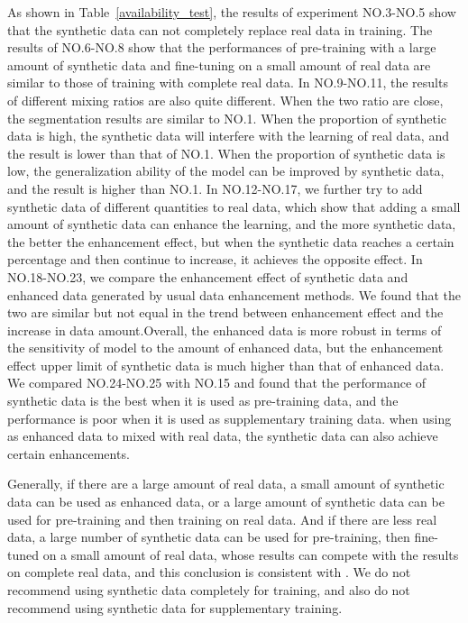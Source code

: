 \documentclass[letterpaper]{article} %
\begin{document}
As shown in Table~\ref{availability_test}, the results of experiment NO.3-NO.5 show that the synthetic data can not completely replace real data in training.           
The results of NO.6-NO.8 show that the performances of pre-training with a large amount of synthetic data and fine-tuning on a small amount of real data are similar to those of training with complete real data.  
In NO.9-NO.11, the results of different mixing ratios are also quite different. When the two ratio are close, the segmentation results are similar to NO.1. When the proportion of synthetic data is high, the synthetic data will interfere with the learning of real data, and the result is lower than that of NO.1. When the proportion of synthetic data is low, the generalization ability of the model can be improved by synthetic data, and the result is higher than NO.1.           
In NO.12-NO.17, we further try to add synthetic data of different quantities to real data, which show that adding a small amount of synthetic data can enhance the learning, and the more synthetic data, the better the enhancement effect, but when the synthetic data reaches a certain percentage and then continue to increase, it achieves the opposite effect. 
In NO.18-NO.23, we compare the enhancement effect of synthetic data and enhanced data generated by usual data enhancement methods. We found that the two are similar but not equal in the trend between  enhancement effect and the increase in data amount.Overall, the enhanced data is more robust in terms of the sensitivity of model to the amount of enhanced data, but the enhancement effect upper limit of synthetic data is much higher than that of enhanced data.  
We compared NO.24-NO.25 with NO.15 and found that the performance of synthetic data is the best when it is used as pre-training data, and the performance is poor when it is used as supplementary training data. when using as enhanced data to mixed with real data, the synthetic data can also achieve certain enhancements.

Generally, if there are a large amount of real data, a small amount of synthetic data can be used as enhanced data, or a large amount of synthetic data can be used for pre-training and then training on real data. And if there are less real data, a large number of synthetic data can be used for pre-training, then fine-tuned on a small amount of real data, whose results can compete with the results on complete real data, and this conclusion is consistent with \cite{4shin2018medical}. We do not recommend using synthetic data completely for training, and also do not recommend using synthetic data for supplementary training.
\end{document}
